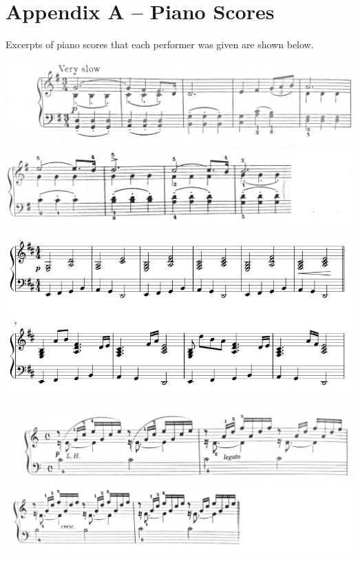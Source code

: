 \documentclass[oneside, a4paper,12pt]{book}
\begin{document}
\chapter{Appendix A -- Piano Scores}\label{chapter:appendix a}

Excerpts of piano scores that each performer was given are shown below.

\begin{minipage}{\textwidth}
  \centering
  \includegraphics[scale=0.5]{largo}
\end{minipage}

\begin{minipage}{\textwidth}
  \centering
  \includegraphics[scale=0.5]{sweden}
\end{minipage}

\begin{minipage}{\textwidth}
  \centering
  \includegraphics[scale=0.5]{prelude}
\end{minipage}
\end{document}
